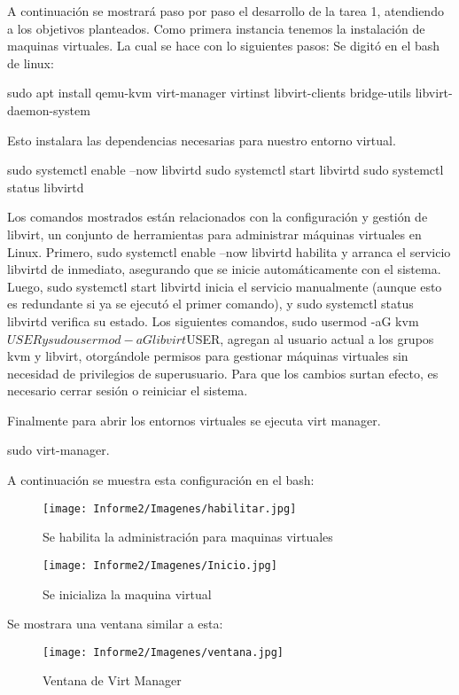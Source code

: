 \documentclass[conference]{IEEEtran}
\begin{document}
A continuación se mostrará paso por paso el desarrollo de la tarea 1, atendiendo a los objetivos planteados. Como primera instancia tenemos la instalación de maquinas virtuales. La cual se hace con lo siguientes pasos:
Se digitó en el bash de linux:

sudo apt install qemu-kvm virt-manager virtinst libvirt-clients bridge-utils libvirt-daemon-system

Esto instalara las dependencias necesarias para nuestro entorno virtual. 

sudo systemctl enable --now libvirtd
sudo systemctl start libvirtd
sudo systemctl status libvirtd

Los comandos mostrados están relacionados con la configuración y gestión de libvirt, un conjunto de herramientas para administrar máquinas virtuales en Linux. Primero, sudo systemctl enable --now libvirtd habilita y arranca el servicio libvirtd de inmediato, asegurando que se inicie automáticamente con el sistema. Luego, sudo systemctl start libvirtd inicia el servicio manualmente (aunque esto es redundante si ya se ejecutó el primer comando), y sudo systemctl status libvirtd verifica su estado. Los siguientes comandos, sudo usermod -aG kvm $USER y sudo usermod -aG libvirt $USER, agregan al usuario actual a los grupos kvm y libvirt, otorgándole permisos para gestionar máquinas virtuales sin necesidad de privilegios de superusuario. Para que los cambios surtan efecto, es necesario cerrar sesión o reiniciar el sistema.

Finalmente para abrir los entornos virtuales se ejecuta virt manager. 

sudo virt-manager.

A continuación se muestra esta configuración en el bash:

\begin{figure}[h!]
\centering
\texttt{[image: Informe2/Imagenes/habilitar.jpg]}
\caption{Se habilita la administración para maquinas virtuales}
\end{figure}

\begin{figure}[h!]
\centering
\texttt{[image: Informe2/Imagenes/Inicio.jpg]}
\caption{Se inicializa la maquina virtual}
\end{figure}

Se mostrara una ventana similar a esta:

\begin{figure}[h!]
\centering
\texttt{[image: Informe2/Imagenes/ventana.jpg]}
\caption{Ventana de Virt Manager}
\end{figure}
\end{document}
